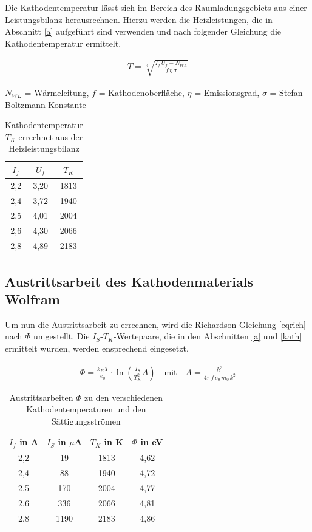 Die Kathodentemperatur lässt sich im Bereich des Raumladungsgebiets aus einer Leistungsbilanz herausrechnen. Hierzu werden die Heizleistungen,
die in Abschnitt \ref{a} aufgeführt sind verwenden und nach folgender Gleichung die Kathodentemperatur ermittelt.

\begin{formel}
 \begin{align}
  T = \sqrt[4]{\frac{I_f\,U_f - N_{WL}}{f \, \eta \, \sigma}}
 \end{align}
\caption*{\small{$N_{WL}$ = Wärmeleitung, $f$ = Kathodenoberfläche, $\eta$ = Emissionsgrad, $\sigma$ = Stefan-Boltzmann Konstante}}
\end{formel}


\begin{table}[H]
 \begin{tabular}{c|c|c}
  $I_f$ & $U_f$ & $T_K$ \\
  \hline
2,2&	3,20&	1813 \\
2,4&	3,72&	1940\\
2,5&	4,01&	2004\\
2,6&	4,30&	2066\\
2,8&	4,89&	2183\\
 \end{tabular}
\caption{Kathodentemperatur $T_K$ errechnet aus der Heizleistungsbilanz}
\end{table}

\subsection{Austrittsarbeit des Kathodenmaterials Wolfram}
\label{wolf}
Um nun die Austrittsarbeit zu errechnen, wird die Richardson-Gleichung \eqref{eqrich} nach  $\Phi$ umgestellt. Die $I_S$-$T_K$-Wertepaare,
die in den Abschnitten \ref{a} und \ref{kath} ermittelt wurden, werden ensprechend eingesetzt.

\begin{align}
 \Phi = \frac{k_B \, T}{e_0} \cdot \ln\left(\frac{I_S}{T_K^2}A \right) \quad \text{mit} \quad A = \frac{h^3}{4 \pi \, f \, e_0 \, m_0 \, k^2}
\end{align}

\begin{table}[H]
 \begin{tabular}{c|c|c|c}
$I_f$ in A & $I_S$ in $\mu$A & $T_K$ in K &$\Phi$ in eV \\
\hline
2,2&	19&	1813&	4,62\\
2,4&	88&	1940&	4,72\\
2,5&	170&	2004&	4,77\\
2,6&	336&	2066&	4,81\\
2,8&	1190&	2183&	4,86 \\

 \end{tabular}
\caption{Austrittsarbeiten $\Phi$ zu den verschiedenen Kathodentemperaturen und den Sättigungsströmen}
\label{tabrich}
\end{table}

